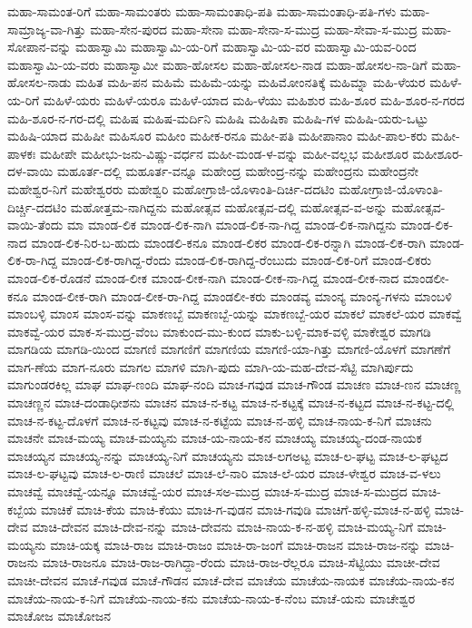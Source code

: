 ಮಹಾ-ಸಾಮಂತ-ರಿಗೆ
ಮಹಾ-ಸಾಮಂತರು
ಮಹಾ-ಸಾಮಂತಾಧಿ-ಪತಿ
ಮಹಾ-ಸಾಮಂತಾಧಿ-ಪತಿ-ಗಳು
ಮಹಾ-ಸಾಮ್ರಾಜ್ಯ-ವಾ-ಗಿತ್ತು
ಮಹಾ-ಸೇನ-ಪುರದ
ಮಹಾ-ಸೇನಾ
ಮಹಾ-ಸೇನಾ-ಸ-ಮುದ್ರ
ಮಹಾ-ಸೇವಾ-ಸ-ಮುದ್ರ
ಮಹಾ-ಸೋಪಾನ-ವನ್ನು
ಮಹಾಸ್ವಾಮಿ
ಮಹಾಸ್ವಾಮಿ-ಯ-ರಿಗೆ
ಮಹಾಸ್ವಾಮಿ-ಯ-ವರ
ಮಹಾಸ್ವಾಮಿ-ಯವ-ರಿಂದ
ಮಹಾಸ್ವಾಮಿ-ಯ-ವರು
ಮಹಾಸ್ವಾಮೀ
ಮಹಾ-ಹೋಸಲ
ಮಹಾ-ಹೋಸಲ-ನಾಡ
ಮಹಾ-ಹೋಸಲ-ನಾ-ಡಿಗೆ
ಮಹಾ-ಹೋಸಲ-ನಾಡು
ಮಹಿತ
ಮಹಿ-ಪನ
ಮಹಿಮೆ
ಮಹಿಮೆ-ಯನ್ನು
ಮಹಿಮೋಂನತಿಕ್ಕೆ
ಮಹಿಮ್ನಾ
ಮಹಿ-ಳೆಯರ
ಮಹಿಳೆ-ಯ-ರಿಗೆ
ಮಹಿಳೆ-ಯರು
ಮಹಿಳೆ-ಯರೂ
ಮಹಿಳೆ-ಯಾದ
ಮಹಿ-ಳೆಯು
ಮಹಿಶುರ
ಮಹಿ-ಶೂರ
ಮಹಿ-ಶೂರ-ನ-ಗರದ
ಮಹಿ-ಶೂರ-ನ-ಗರ-ದಲ್ಲಿ
ಮಹಿಷ
ಮಹಿಷ-ಮರ್ದಿನಿ
ಮಹಿಷಿ
ಮಹಿಷಿಕಾ
ಮಹಿಷಿ-ಗಳ
ಮಹಿಷಿ-ಯರು-ಒಟ್ಟು
ಮಹಿಷಿ-ಯಾದ
ಮಹಿಷೀ
ಮಹಿಸೂರ
ಮಹೀಂ
ಮಹೀಕ-ರನೂ
ಮಹೀ-ಪತಿ
ಮಹೀಪಾನಾಂ
ಮಹೀ-ಪಾಲ-ಕರು
ಮಹೀ-ಪಾಳಕಃ
ಮಹೀಪೇ
ಮಹೀಭು-ಜನು-ವಿಷ್ಣು-ವರ್ಧನ
ಮಹೀ-ಮಂಡ-ಳ-ವನ್ನು
ಮಹೀ-ವಲ್ಲಭ
ಮಹೀಶೂರ
ಮಹೀಶೂರ-ದಳ-ವಾಯಿ
ಮಹೂರ್ತ-ದಲ್ಲಿ
ಮಹೂರ್ತ-ವನ್ನೂ
ಮಹೇಂದ್ರ
ಮಹೇಂದ್ರ-ನನ್ನು
ಮಹೇಂದ್ರನು
ಮಹೇಂದ್ರನೇ
ಮಹೇಶ್ವರ-ನಿಗೆ
ಮಹೇಶ್ವರರು
ಮಹೇಶ್ವರಿ
ಮಹೋಗ್ರಾಜಿ-ಯೊಳಾಂತಿ-ದಿರ್ಚಿ-ದದಟಿಂ
ಮಹೋಗ್ರಾಜಿ-ಯೊಳಾಂತಿ-ದಿರ್ಚ್ಚಿ-ದದಟಿಂ
ಮಹೋತ್ತಮ-ನಾಗಿದ್ದನು
ಮಹೋತ್ಸವ
ಮಹೋತ್ಸವ-ದಲ್ಲಿ
ಮಹೋತ್ಸವ-ವ-ಅನ್ನು
ಮಹೋತ್ಸವ-ವಾಯಿ-ತೆಂದು
ಮಾ
ಮಾಂಡ-ಲಿಕ
ಮಾಂಡ-ಲಿಕ-ನಾಗಿ
ಮಾಂಡ-ಲಿಕ-ನಾ-ಗಿದ್ದ
ಮಾಂಡ-ಲಿಕ-ನಾಗಿದ್ದನು
ಮಾಂಡ-ಲಿಕ-ನಾದ
ಮಾಂಡ-ಲಿಕ-ನಿರ-ಬ-ಹುದು
ಮಾಂಡಲಿ-ಕನೂ
ಮಾಂಡ-ಲಿಕರ
ಮಾಂಡ-ಲಿಕ-ರನ್ನಾಗಿ
ಮಾಂಡ-ಲಿಕ-ರಾಗಿ
ಮಾಂಡ-ಲಿಕ-ರಾ-ಗಿದ್ದ
ಮಾಂಡ-ಲಿಕ-ರಾಗಿದ್ದ-ರೆಂದು
ಮಾಂಡ-ಲಿಕ-ರಾಗಿದ್ದ-ರೆಂಬುದು
ಮಾಂಡ-ಲಿಕ-ರಿಗೆ
ಮಾಂಡ-ಲಿಕರು
ಮಾಂಡ-ಲಿಕ-ರೊಡನೆ
ಮಾಂಡ-ಲೀಕ
ಮಾಂಡ-ಲೀಕ-ನಾಗಿ
ಮಾಂಡ-ಲೀಕ-ನಾ-ಗಿದ್ದ
ಮಾಂಡ-ಲೀಕ-ನಾದ
ಮಾಂಡಲೀ-ಕನೂ
ಮಾಂಡ-ಲೀಕ-ರಾಗಿ
ಮಾಂಡ-ಲೀಕ-ರಾ-ಗಿದ್ದ
ಮಾಂಡಲೀ-ಕರು
ಮಾಂಡವ್ಯ
ಮಾಂನ್ಯ
ಮಾಂನ್ಯ-ಗಳನು
ಮಾಂಬಳಿ
ಮಾಂಬಳ್ಳಿ
ಮಾಂಸ
ಮಾಂಸ-ವನ್ನು
ಮಾಕಣಬ್ಬೆ
ಮಾಕಣಬ್ಬೆ-ಯನ್ನು
ಮಾಕಣಬ್ಬೆ-ಯರ
ಮಾಕಲೆ
ಮಾಕಲೆ-ಯರ
ಮಾಕವ್ವೆ
ಮಾಕವ್ವೆ-ಯರ
ಮಾಕ-ಸ-ಮುದ್ರ-ವೆಂಬ
ಮಾಕುಂದ-ಮು-ಕುಂದ
ಮಾಕು-ಬಳ್ಳಿ-ಮಾಕ-ವಳ್ಳಿ
ಮಾಕೇಶ್ವರ
ಮಾಗಡಿ
ಮಾಗಡಿಯ
ಮಾಗಡಿ-ಯಿಂದ
ಮಾಗಣಿ
ಮಾಗಣಿಗೆ
ಮಾಗಣಿಯ
ಮಾಗಣಿ-ಯಾ-ಗಿತ್ತು
ಮಾಗಣಿ-ಯೊಳಗೆ
ಮಾಗಣೆಗೆ
ಮಾಗ-ಣೆಯ
ಮಾಗ-ನೂರು
ಮಾಗಲ
ಮಾಗಳಿ
ಮಾಗಿ-ಪುದು
ಮಾಗಿ-ಯ-ಮಹ-ದೇವ-ಸೆಟ್ಟಿ
ಮಾಗಿರ್ಪುದು
ಮಾಗುಂಡರಕಿಲ್ಲ
ಮಾಘ
ಮಾಘ-ಣಂದಿ
ಮಾಘ-ನಂದಿ
ಮಾಚ-ಗವುಡ
ಮಾಚ-ಗೌಂಡ
ಮಾಚಣ
ಮಾಚ-ಣನ
ಮಾಚಣ್ಣ
ಮಾಚಣ್ಣನ
ಮಾಚ-ದಂಡಾಧೀಶನು
ಮಾಚನ
ಮಾಚ-ನ-ಕಟ್ಟ
ಮಾಚ-ನ-ಕಟ್ಟಕ್ಕೆ
ಮಾಚ-ನ-ಕಟ್ಟದ
ಮಾಚ-ನ-ಕಟ್ಟ-ದಲ್ಲಿ
ಮಾಚ-ನ-ಕಟ್ಟ-ದೊಳಗೆ
ಮಾಚ-ನ-ಕಟ್ಟವು
ಮಾಚ-ನ-ಕಟ್ಟೆಯ
ಮಾಚ-ನ-ಹಳ್ಳಿ
ಮಾಚ-ನಾಯ-ಕ-ನಿಗೆ
ಮಾಚನು
ಮಾಚನೇ
ಮಾಚ-ಮಯ್ಯ
ಮಾಚ-ಮಯ್ಯನು
ಮಾಚ-ಯ-ನಾಯ-ಕನ
ಮಾಚಯ್ಯ
ಮಾಚಯ್ಯ-ದಂಡ-ನಾಯಕ
ಮಾಚಯ್ಯನ
ಮಾಚಯ್ಯ-ನನ್ನು
ಮಾಚಯ್ಯ-ನಿಗೆ
ಮಾಚಯ್ಯನು
ಮಾಚ-ಲಗಅಟ್ಟ
ಮಾಚ-ಲ-ಘಟ್ಟ
ಮಾಚ-ಲ-ಘಟ್ಟದ
ಮಾಚ-ಲ-ಘಟ್ಟವು
ಮಾಚ-ಲ-ರಾಣಿ
ಮಾಚಲೆ
ಮಾಚ-ಲೆ-ನಾರಿ
ಮಾಚ-ಲೆ-ಯರ
ಮಾಚ-ಳೇಶ್ವರ
ಮಾಚ-ವ-ಳಲು
ಮಾಚವ್ವೆ
ಮಾಚವ್ವೆ-ಯನ್ನೂ
ಮಾಚವ್ವೆ-ಯರ
ಮಾಚ-ಸಅ-ಮುದ್ರ
ಮಾಚ-ಸ-ಮುದ್ರ
ಮಾಚ-ಸ-ಮುದ್ರದ
ಮಾಚಿ-ಕಬ್ಬೆಯ
ಮಾಚಿಕೆ
ಮಾಚಿ-ಕೆಯ
ಮಾಚಿ-ಕೆಯು
ಮಾಚಿ-ಗ-ವುಡನ
ಮಾಚಿ-ಗವುಡಿ
ಮಾಚಿಗೆ-ಹಳ್ಳಿ-ಮಾಚ-ನ-ಹಳ್ಳಿ
ಮಾಚಿ-ದೇವ
ಮಾಚಿ-ದೇವನ
ಮಾಚಿ-ದೇವ-ನನ್ನು
ಮಾಚಿ-ದೇವನು
ಮಾಚಿ-ನಾಯ-ಕ-ನ-ಹಳ್ಳಿ
ಮಾಚಿ-ಮಯ್ಯ-ನಿಗೆ
ಮಾಚಿ-ಮಯ್ಯನು
ಮಾಚಿ-ಯಕ್ಕ
ಮಾಚಿ-ರಾಜ
ಮಾಚಿ-ರಾಜಂ
ಮಾಚಿ-ರಾ-ಜಂಗೆ
ಮಾಚಿ-ರಾಜನ
ಮಾಚಿ-ರಾಜ-ನನ್ನು
ಮಾಚಿ-ರಾಜನು
ಮಾಚಿ-ರಾಜನೂ
ಮಾಚಿ-ರಾಜ-ರಾಗಿದ್ದಾ-ರೆಂದು
ಮಾಚಿ-ರಾಜ-ರೆಲ್ಲರೂ
ಮಾಚಿ-ಸೆಟ್ಟಿಯು
ಮಾಚೀ-ದೇವ
ಮಾಚೀ-ದೇವನ
ಮಾಚೆ-ಗವುಡ
ಮಾಚೆ-ಗೌಡನ
ಮಾಚೆ-ದೇವ
ಮಾಚೆಯ
ಮಾಚೆಯ-ನಾಯಕ
ಮಾಚೆಯ-ನಾಯ-ಕನ
ಮಾಚೆಯ-ನಾಯ-ಕ-ನಿಗೆ
ಮಾಚೆಯ-ನಾಯ-ಕನು
ಮಾಚೆಯ-ನಾಯ-ಕ-ನೆಂಬ
ಮಾಚೆ-ಯನು
ಮಾಚೇಶ್ವರ
ಮಾಚೋಜ
ಮಾಚೋಜನ
